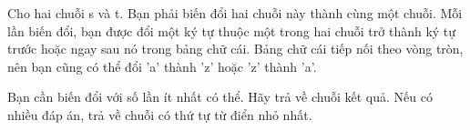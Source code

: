 Cho hai chuỗi s và t. Bạn phải biến đổi hai chuỗi này thành cùng một chuỗi. Mỗi lần biến đổi, bạn được đổi một ký tự thuộc một trong hai chuỗi trở thành ký tự trước hoặc ngay sau nó trong bảng chữ cái. Bảng chữ cái tiếp nối theo vòng tròn, nên bạn cũng có thể đổi 'a' thành 'z' hoặc 'z' thành 'a'.  

   Bạn cần biến đổi với số lần ít nhất có thể. Hãy trả về chuỗi kết quả. Nếu có nhiều đáp án, trả về chuỗi có thứ tự từ điển nhỏ nhất.